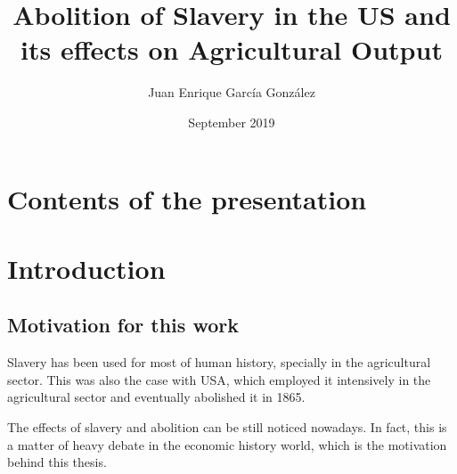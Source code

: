 \documentclass[11pt]{beamer}
\author{Juan Enrique García González}
\title{Abolition of Slavery in the US and its effects on Agricultural Output}
\institute{Universidad Carlos III de Madrid}
\date{September 2019}
\begin{document}
\begin{frame}%
\titlepage
\end{frame}

\section*{Contents of the presentation}
\begin{frame}
\tableofcontents
\end{frame}

%
%
%

\section{Introduction}
\subsection{Motivation for this work}
\begin{frame}
Slavery has been used for most of human history, specially in the agricultural sector. This was also the case with USA, which employed it intensively in the agricultural sector and eventually abolished it in 1865. 

\vspace{\baselineskip}
The effects of slavery and abolition can be still noticed nowadays. In fact, this is a matter of heavy debate in the economic history world, which is the motivation behind this thesis.
\end{frame}
\end{document}
